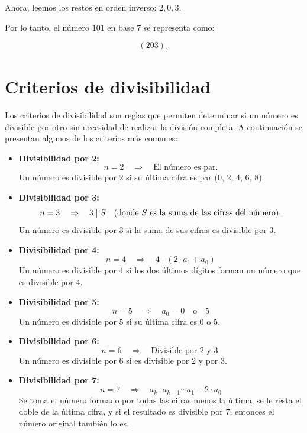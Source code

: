 \documentclass{article}
\begin{document}
Ahora, leemos los restos en orden inverso: $ 2, 0, 3 $.

Por lo tanto, el número $ 101 $ en base $ 7 $ se representa como:

$$(203)_7$$

\newpage

\section{Criterios de divisibilidad}

Los criterios de divisibilidad son reglas que permiten determinar si un número es divisible por otro sin necesidad de realizar la división completa. A continuación se presentan algunos de los criterios más comunes:

\begin{itemize}
    \item \textbf{Divisibilidad por 2:} 
    $$n = 2 \quad \Rightarrow \quad \text{El número es par.}$$
    Un número es divisible por 2 si su última cifra es par (0, 2, 4, 6, 8).

    \item \textbf{Divisibilidad por 3:} 
    $$n = 3 \quad \Rightarrow \quad 3 \mid S \quad \text{(donde $ S $ es la suma de las cifras del número).}$$
    Un número es divisible por 3 si la suma de sus cifras es divisible por 3.

    \item \textbf{Divisibilidad por 4:} 
    $$n = 4 \quad \Rightarrow \quad 4 \mid (2 \cdot a_1 + a_0)$$
    Un número es divisible por 4 si los dos últimos dígitos forman un número que es divisible por 4.

    \item \textbf{Divisibilidad por 5:} 
    $$n = 5 \quad \Rightarrow \quad a_0 = 0 \quad \text{o} \quad 5$$
    Un número es divisible por 5 si su última cifra es 0 o 5.

    \item \textbf{Divisibilidad por 6:} 
    $$n = 6 \quad \Rightarrow \quad \text{Divisible por 2 y 3.}$$
    Un número es divisible por 6 si es divisible por 2 y por 3.

    \item \textbf{Divisibilidad por 7:} 
    $$n = 7 \quad \Rightarrow \quad a_k \cdot a_{k-1} \cdots a_1 - 2 \cdot a_0$$
    Se toma el número formado por todas las cifras menos la última, se le resta el doble de la última cifra, y si el resultado es divisible por 7, entonces el número original también lo es.


\end{itemize}
\end{document}

